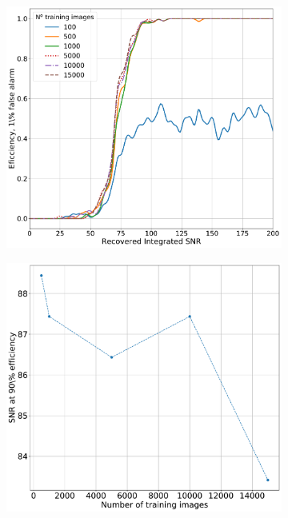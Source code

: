\begin{figure}[h]
	\begin{subfigure}[h]{0.5\textwidth}
		\includegraphics[width=\linewidth]{C4_cnn/gauss_sens_with_trainnum_eff.pdf}
		\label{machine:cnn:sens_size:gauss_sens:eff}
		\caption{}
	\end{subfigure}
	\begin{subfigure}[h]{0.5\textwidth}
		\includegraphics[width=\linewidth]{C4_cnn/gauss_sens_with_trainnum.pdf}

\end{subfigure}
\end{figure}
